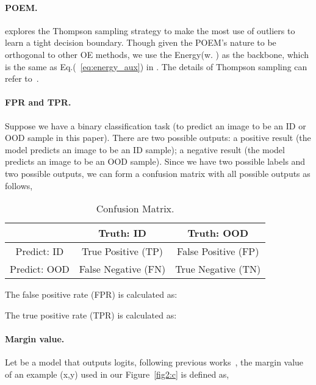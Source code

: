 \documentclass{article}
\theoremstyle{plain}
\theoremstyle{definition}
\theoremstyle{remark}
\begin{document}
\paragraph{POEM.} \citep{ming2022poem} explores the Thompson sampling strategy \citep{thompson} to make the most use of outliers to learn a tight decision boundary. Though given the POEM's nature to be orthogonal to other OE methods, we use the Energy(w. ) as the backbone, which is the same as Eq.(~\ref{eq:energy_aux}) in \citet{liu2020energy}. The details of Thompson sampling can refer to~\citet{ming2022poem}.

\paragraph{FPR and TPR.} Suppose we have a binary classification task (to predict an image to be an ID or OOD sample in this paper). There are two possible outputs: a positive result (the model predicts an image to be an ID sample); a negative result (the model predicts an image to be an OOD sample). Since we have two possible labels and two possible outputs, we can form a confusion matrix with all possible outputs as follows,

\begin{table}[h!]
    \caption{Confusion Matrix.}
    \vspace{3mm}
    \centering
    \footnotesize
    \begin{tabular}{c|c|c}
         \toprule[0.6pt]
         & Truth: ID & Truth: OOD\\
        \midrule[0.6pt]
         Predict: ID & True Positive (TP) & False Positive (FP)\\
        \midrule[0.6pt]
         Predict: OOD & False Negative (FN) & True Negative (TN)\\
         \bottomrule[0.6pt]
    \end{tabular}
    \label{tab:confusion}
\end{table}


The false positive rate (FPR) is calculated as:

The true positive rate (TPR) is calculated as:


\paragraph{Margin value.} Let  be a model that outputs  logits, following previous works~\citep{koltchinskii2002empirical,cao2019learning}, the margin value of an example (x,y) used in our Figure~\ref{fig2:c} is defined as,
\end{document}
